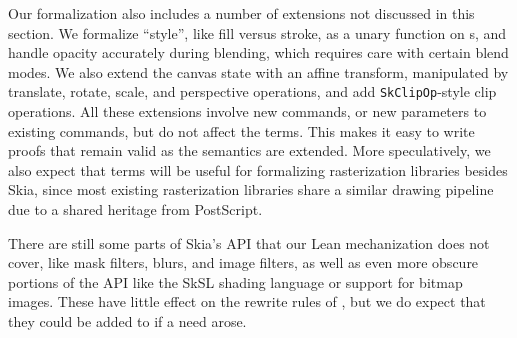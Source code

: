 Our formalization also includes a number of extensions
  not discussed in this section.
We formalize ``style'', like fill versus stroke,
  as a unary function on \Shape{}s,
  and handle opacity accurately during blending,
  which requires care with certain blend modes.
We also extend the canvas state with an affine transform,
  manipulated by translate, rotate, scale, and perspective operations,
  and add \texttt{SkClipOp}-style clip operations.
All these extensions involve new \muskia commands,
  or new parameters to existing \muskia commands,
  but do not affect the \Layer terms.
This makes it easy to write proofs that remain valid
  as the semantics are extended.
More speculatively, we also expect that
  \Layer terms will be useful for formalizing
  rasterization libraries besides Skia,
  since most existing rasterization libraries
  share a similar drawing pipeline
  due to a shared heritage from PostScript.

There are still some parts of Skia's API
  that our Lean mechanization does not cover,
  like mask filters, blurs, and image filters,
  as well as even more obscure portions of the API
  like the SkSL shading language or support for bitmap images.
These have little effect on the rewrite rules of ,
  but we do expect that they could be added to \muskia if a need arose.
